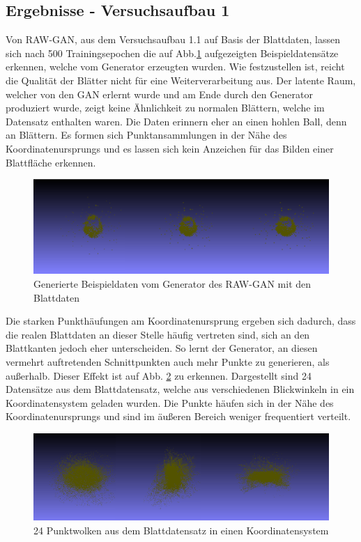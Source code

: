 \documentclass{llncs}
\begin{document}
\subsection{Ergebnisse - Versuchsaufbau 1}

Von RAW-GAN, aus dem Versuchsaufbau 1.1 auf Basis der Blattdaten, lassen sich nach 500 Trainingsepochen die auf  Abb.\ref{fig:Bild100} aufgezeigten Beispieldatensätze erkennen, welche vom Generator erzeugten wurden. Wie festzustellen ist, reicht die Qualität der Blätter nicht für eine Weiterverarbeitung aus. Der latente Raum, welcher von den GAN erlernt wurde und am Ende durch den Generator produziert wurde, zeigt keine Ähnlichkeit zu normalen Blättern, welche im Datensatz enthalten waren. Die Daten erinnern eher an einen hohlen Ball, denn an Blättern. Es formen sich Punktansammlungen in der Nähe des Koordinatenursprungs und es lassen sich kein Anzeichen für das Bilden einer Blattfläche erkennen.
\begin{figure}[htbp] 
	\centering
	\includegraphics[width=1.0\textwidth]{raw_gan_leaf_example.png}
	\caption{Generierte Beispieldaten vom Generator des RAW-GAN mit den Blattdaten}
	\label{fig:Bild100}
\end{figure}
Die starken Punkthäufungen am Koordinatenursprung ergeben sich dadurch, dass die realen Blattdaten an dieser Stelle häufig vertreten sind, sich an den Blattkanten jedoch eher unterscheiden. So lernt der Generator, an diesen vermehrt auftretenden Schnittpunkten auch mehr Punkte zu generieren, als außerhalb. Dieser Effekt ist auf Abb. \ref{fig:Bild81} zu erkennen. Dargestellt sind 24 Datensätze aus dem Blattdatensatz, welche aus verschiedenen Blickwinkeln in ein Koordinatensystem geladen wurden. Die Punkte häufen sich in der Nähe des Koordinatenursprungs und sind im äußeren Bereich weniger frequentiert verteilt.  
\begin{figure}[htbp] 
	\centering
	\includegraphics[width=1.0\textwidth]{ansammlung.png}
	\caption{24 Punktwolken aus dem Blattdatensatz in einen Koordinatensystem}
	\label{fig:Bild81}
\end{figure}
\end{document}
